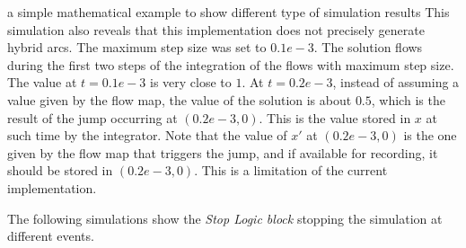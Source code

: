 \begin{example}{a simple mathematical example to show different type of simulation results}
This simulation also reveals that this implementation does not
precisely generate hybrid arcs. The maximum step size was set to $0.1
e-3$. The solution flows during the first two steps of the integration
of the flows with maximum step size. The value at $t=0.1e-3$ is very
close to $1$. At $t=0.2e-3$, instead of assuming a value given by the
flow map, the value of the solution is about $0.5$, which is the
result of the jump occurring at $(0.2e-3,0)$. This is the value stored
in $x$ at such time by the integrator. Note that the value of $x'$ at
$(0.2e-3,0)$ is the one given by the flow map that triggers the jump,
and if available for recording, it should be stored in $(0.2e-3,0)$.
This is a limitation of the current implementation.


%


The following simulations show the {\em Stop Logic block} stopping
the simulation at different events.
\\


\end{example}
